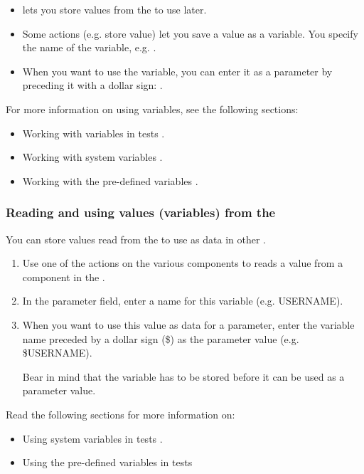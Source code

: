 
\begin{itemize}
\item \jb{} lets you store values from the \gdaut{} to use later.
\item Some actions (e.g. store value) let you save a value as a variable. You specify the name of the variable, e.g. . 
\item When you want to use the variable, you can enter it as a parameter by preceding it with a dollar sign: . 
\end{itemize}
For more information on using variables, see the following sections:
\begin{itemize}
\item Working with variables in tests .
\item Working with system variables .
\item Working with the \jb{} pre-defined variables .
\end{itemize}

\subsubsection{Reading and using values (variables) from the \gdaut{}}
\label{TasksAUTVariables}

You can store values read from the \gdaut{} to use as data in other \gdcases{}. 

\begin{enumerate}
\item Use one of  the  actions on the various components to  reads a value from a component in the \gdaut{}. 

\item In the parameter field, enter a name for this variable (e.g. USERNAME). 

\item When you want to use this value as data for a parameter, enter the variable name preceded by a dollar sign (\$) as the parameter value (e.g. \$USERNAME).

Bear in mind that the variable has to be stored before it can be used as a parameter value.  

\end{enumerate}
Read the following sections for more information on:
\begin{itemize}
\item Using system variables in tests . 
\item Using the pre-defined \jb{} variables in tests 
\end{itemize}


